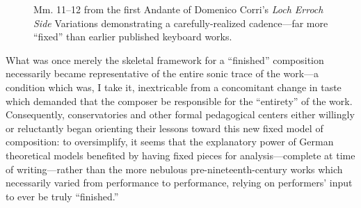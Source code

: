         \begin{figure}
            \centering
            \captionsetup{width=.5\textwidth}
            \caption[Mm. 11--12 from the first Andante of Domenico Corri's breezy \textit{Loch Erroch Side} Variations demonstrating a carefully-realized cadence---far more ``fixed'' than earlier published keyboard works.]{Mm. 11--12 from the first Andante of Domenico Corri's \textit{Loch Erroch Side} Variations demonstrating a carefully-realized cadence---far more ``fixed'' than earlier published keyboard works.\footnotemark}
            \label{fig:Corri}
        \end{figure}
    
    What was once merely the skeletal framework for a ``finished'' composition necessarily became representative of the entire sonic trace of the work---a condition which was, I take it, inextricable from a concomitant change in taste which demanded that the composer be responsible for the ``entirety'' of the work. Consequently, conservatories and other formal pedagogical centers either willingly or reluctantly began orienting their lessons toward this new fixed model of composition: to oversimplify, it seems that the explanatory power of German theoretical models benefited by having fixed pieces for analysis---complete at time of writing---rather than the more nebulous pre-nineteenth-century works which necessarily varied from performance to performance, relying on performers' input to ever be truly ``finished.''

